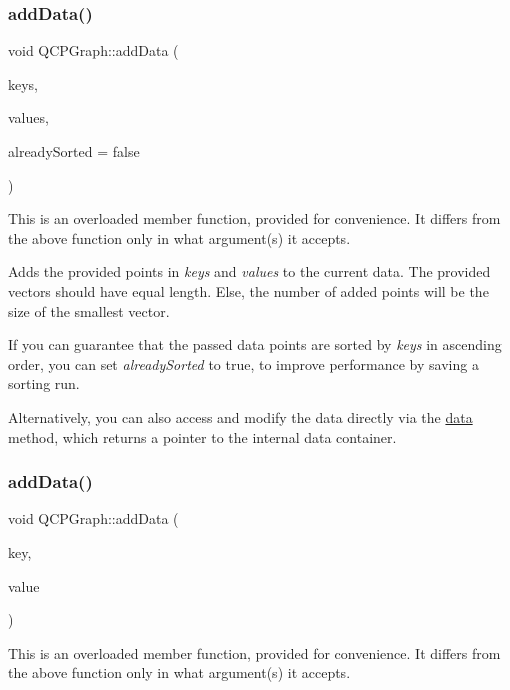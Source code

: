 \subsubsection{\texorpdfstring{addData()}{addData()}\hspace{0.1cm}{\footnotesize\ttfamily [1/2]}}
{\footnotesize\ttfamily void Q\+C\+P\+Graph\+::add\+Data (\begin{DoxyParamCaption}\item[{const Q\+Vector$<$ double $>$ \&}]{keys,  }\item[{const Q\+Vector$<$ double $>$ \&}]{values,  }\item[{bool}]{already\+Sorted = {\ttfamily false} }\end{DoxyParamCaption})}

This is an overloaded member function, provided for convenience. It differs from the above function only in what argument(s) it accepts.

Adds the provided points in {\itshape keys} and {\itshape values} to the current data. The provided vectors should have equal length. Else, the number of added points will be the size of the smallest vector.

If you can guarantee that the passed data points are sorted by {\itshape keys} in ascending order, you can set {\itshape already\+Sorted} to true, to improve performance by saving a sorting run.

Alternatively, you can also access and modify the data directly via the \mbox{\hyperlink{class_q_c_p_graph_a141aa31a1f19bbd0ce60f55eaeb9ea60}{data}} method, which returns a pointer to the internal data container. \mbox{\label{class_q_c_p_graph_a0bf98b1972286cfb7b1c4b7dd6ae2012}} 
\subsubsection{\texorpdfstring{addData()}{addData()}\hspace{0.1cm}{\footnotesize\ttfamily [2/2]}}
{\footnotesize\ttfamily void Q\+C\+P\+Graph\+::add\+Data (\begin{DoxyParamCaption}\item[{double}]{key,  }\item[{double}]{value }\end{DoxyParamCaption})}

This is an overloaded member function, provided for convenience. It differs from the above function only in what argument(s) it accepts.

